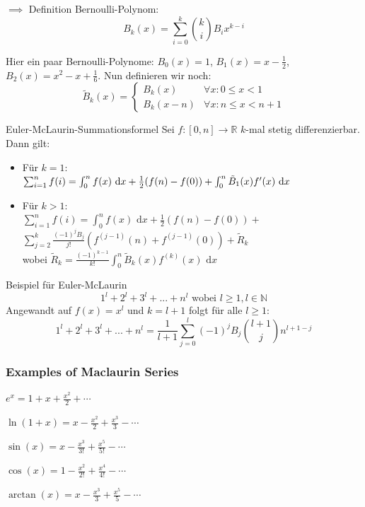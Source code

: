 \documentclass[a4paper]{article}
\def\dx{\text{ d}x}
\newcommand\R{\ensuremath{\mathbb{R}}}
\begin{document}
$\implies$ Definition Bernoulli-Polynom: $$B_k(x) = \sum_{i=0}^{k}{k \choose i}B_ix^{k-i}$$

Hier ein paar Bernoulli-Polynome: $B_0(x) = 1$, $B_1(x) = x - \frac{1}{2}$, $B_2(x) = x^2 - x + \frac{1}{6}$. Nun definieren wir noch: $$\tilde{B}_k(x) = \begin{cases}
    B_k(x)   & \forall x: 0 \leq x < 1     \\
    B_k(x-n) & \forall x: n \leq x < n + 1
  \end{cases}$$

\begin{mainbox}{Euler-McLaurin-Summationsformel}
  Sei $f: [0, n] \to \R$ $k$-mal stetig differenzierbar. Dann gilt: \\
  \begin{itemize}[leftmargin=4.5mm, topsep=1pt, parsep=1pt]
    \item Für $k = 1$: \\
          $\sum_{i = 1}^n f(i) = \int_0^n f(x) \dx + \frac{1}{2}(f(n) - f(0)) \\ + \int_0^n \tilde{B}_1(x)f'(x)\dx$
    \item Für $k>1$: \\
          $\sum_{i = 1}^n f(i) = \int_0^n f(x) \dx + \frac{1}{2}(f(n) - f(0))+$ \\
          $\sum_{j = 2}^k \frac{(-1)^j B_j}{j!}(f^{(j-1)}(n) + f^{(j-1)}(0)) + \tilde{R}_k$ \\
          wobei $ \tilde{R}_k = \frac{(-1)^{k-1}}{k!} \int_0^n \tilde{B}_k(x)f^{(k)}(x)\dx$
    \end{itemize}
\end{mainbox}

\begin{subbox}{Beispiel für Euler-McLaurin}
  $$1^l + 2^l + 3^l + ... + n^l \text{ wobei } l \geq 1, l \in \mathbb{N}$$
  Angewandt auf $f(x) = x^l$ und $k = l + 1$ folgt für alle $l \geq 1$:
  $$1^l + 2^l + 3^l + ... + n^l = \frac{1}{l + 1} \sum_{j = 0}^l (-1)^j B_j {l + 1 \choose j} n^{l+1-j}$$
\end{subbox}

\subsubsection*{Examples of Maclaurin Series}
\begin{inparaitem}[leftmargin=4mm]
  \item $e^x=1+x+\frac{x^2}{2}+\cdots$
  \item $\ln(1+x)=x-\frac{x^2}{2}+\frac{x^3}{3}-\cdots$
  \item $\sin(x)=x-\frac{x^3}{3!}+\frac{x^5}{5!}-\cdots$
  \item $\cos(x)=1-\frac{x^2}{2!}+\frac{x^4}{4!}-\cdots$
  \item $\arctan(x)=x-\frac{x^3}{3}+\frac{x^5}{5}-\cdots$
\end{inparaitem}
\end{document}
